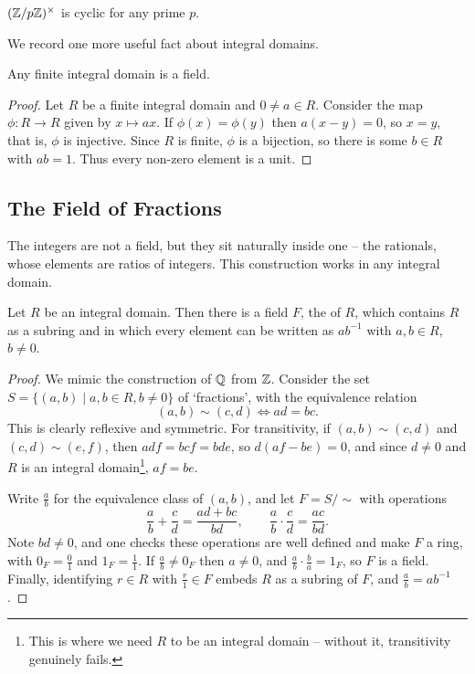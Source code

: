 \documentclass[a4paper]{scrartcl}
\begin{document}
\begin{corollary}
	$(\mathbb{Z}/p\mathbb{Z})^\times$ is cyclic for any prime $p$.
\end{corollary}

We record one more useful fact about integral domains.

\begin{proposition}
	Any finite integral domain is a field.
\end{proposition}
\begin{proof}
	Let $R$ be a finite integral domain and $0 \neq a \in R$. Consider the map $\phi: R \rightarrow R$ given by $x \mapsto ax$. If $\phi(x) = \phi(y)$ then $a(x - y) = 0$, so $x = y$, that is, $\phi$ is injective. Since $R$ is finite, $\phi$ is a bijection, so there is some $b \in R$ with $ab = 1$. Thus every non-zero element is a unit.
\end{proof}

\subsection{The Field of Fractions}

The integers are not a field, but they sit naturally inside one -- the rationals, whose elements are ratios of integers. This construction works in any integral domain.

\begin{theorem}
	Let $R$ be an integral domain. Then there is a field $F$, the  of $R$, which contains $R$ as a subring and in which every element can be written as $a b^{-1}$ with $a, b \in R$, $b \neq 0$.
\end{theorem}
\begin{proof}
	We mimic the construction of $\mathbb{Q}$ from $\mathbb{Z}$. Consider the set $S = \{(a, b) \mid a, b \in R, b \neq 0\}$ of `fractions', with the equivalence relation
	$$
	(a, b) \sim (c, d) \iff ad = bc.
	$$
	This is clearly reflexive and symmetric. For transitivity, if $(a,b) \sim (c,d)$ and $(c, d) \sim (e, f)$, then $adf = bcf = bde$, so $d(af - be) = 0$, and since $d \neq 0$ and $R$ is an integral domain\footnote{This is where we need $R$ to be an integral domain -- without it, transitivity genuinely fails.}, $af = be$.

	Write $\frac{a}{b}$ for the equivalence class of $(a, b)$, and let $F = S/{\sim}$ with operations
	$$
	\frac{a}{b} + \frac{c}{d} = \frac{ad + bc}{bd}, \qquad \frac{a}{b}\cdot \frac{c}{d} = \frac{ac}{bd}.
	$$
	Note $bd \neq 0$, and one checks these operations are well defined and make $F$ a ring, with $0_F = \frac{0}{1}$ and $1_F = \frac{1}{1}$. If $\frac{a}{b} \neq 0_F$ then $a \neq 0$, and $\frac{a}{b} \cdot \frac{b}{a} = 1_F$, so $F$ is a field. Finally, identifying $r \in R$ with $\frac{r}{1} \in F$ embeds $R$ as a subring of $F$, and $\frac{a}{b} = a b^{-1}$.
\end{proof}
\end{document}
